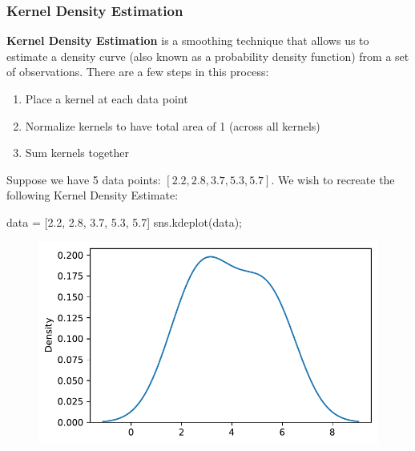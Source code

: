 \documentclass[
  letterpaper,
  DIV=11,
  numbers=noendperiod]{scrreprt}
\newenvironment{Shaded}{\begin{snugshade}}{\end{snugshade}}
\newcommand{\FloatTok}[1]{\textcolor[rgb]{0.68,0.00,0.00}{#1}}
\newcommand{\NormalTok}[1]{\textcolor[rgb]{0.00,0.23,0.31}{#1}}
\newcommand{\OperatorTok}[1]{\textcolor[rgb]{0.37,0.37,0.37}{#1}}
\providecommand{\tightlist}{%
  \setlength{\itemsep}{0pt}\setlength{\parskip}{0pt}}\usepackage{longtable,booktabs,array}
\begin{document}
\hypertarget{kernel-density-estimation}{%
\subsubsection{Kernel Density
Estimation}\label{kernel-density-estimation}}

\textbf{Kernel Density Estimation} is a smoothing technique that allows
us to estimate a density curve (also known as a probability density
function) from a set of observations. There are a few steps in this
process:

\begin{enumerate}
\def\labelenumi{\arabic{enumi}.}
\tightlist
\item
  Place a kernel at each data point
\item
  Normalize kernels to have total area of 1 (across all kernels)
\item
  Sum kernels together
\end{enumerate}

Suppose we have 5 data points: \([2.2, 2.8, 3.7, 5.3, 5.7]\). We wish to
recreate the following Kernel Density Estimate:

\begin{Shaded}
\begin{Highlighting}[]
\NormalTok{data }\OperatorTok{=}\NormalTok{ [}\FloatTok{2.2}\NormalTok{, }\FloatTok{2.8}\NormalTok{, }\FloatTok{3.7}\NormalTok{, }\FloatTok{5.3}\NormalTok{, }\FloatTok{5.7}\NormalTok{]}
\NormalTok{sns.kdeplot(data)}\OperatorTok{;}
\end{Highlighting}
\end{Shaded}

\begin{figure}[H]

{\centering \includegraphics{visualization_2/visualization_2_files/figure-pdf/cell-4-output-1.pdf}

}

\end{figure}
\end{document}
